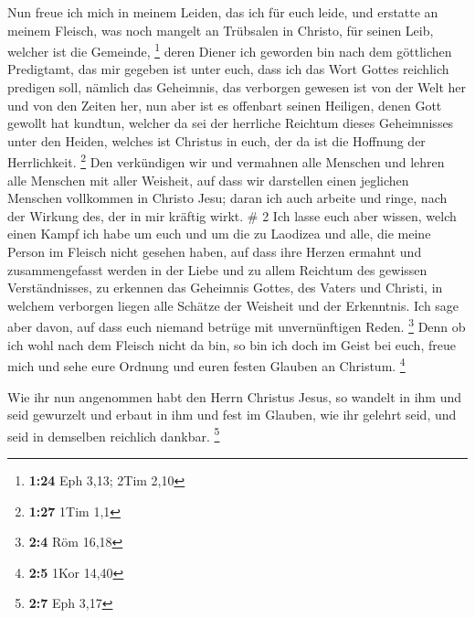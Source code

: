  Nun freue ich mich in meinem Leiden, das ich für euch
leide, und erstatte an meinem Fleisch, was noch mangelt an Trübsalen in
Christo, für seinen Leib, welcher ist die Gemeinde, \footnote{\textbf{1:24}
  Eph 3,13; 2Tim 2,10}  deren Diener ich geworden bin nach
dem göttlichen Predigtamt, das mir gegeben ist unter euch, dass ich das
Wort Gottes reichlich predigen soll,  nämlich das
Geheimnis, das verborgen gewesen ist von der Welt her und von den Zeiten
her, nun aber ist es offenbart seinen Heiligen,  denen Gott
gewollt hat kundtun, welcher da sei der herrliche Reichtum dieses
Geheimnisses unter den Heiden, welches ist Christus in euch, der da ist
die Hoffnung der Herrlichkeit. \footnote{\textbf{1:27} 1Tim 1,1}
 Den verkündigen wir und vermahnen alle Menschen und lehren
alle Menschen mit aller Weisheit, auf dass wir darstellen einen
jeglichen Menschen vollkommen in Christo Jesu;  daran ich
auch arbeite und ringe, nach der Wirkung des, der in mir kräftig wirkt.
\# 2  Ich lasse euch aber wissen, welch einen Kampf ich habe
um euch und um die zu Laodizea und alle, die meine Person im Fleisch
nicht gesehen haben,  auf dass ihre Herzen ermahnt und
zusammengefasst werden in der Liebe und zu allem Reichtum des gewissen
Verständnisses, zu erkennen das Geheimnis Gottes, des Vaters und
Christi,  in welchem verborgen liegen alle Schätze der
Weisheit und der Erkenntnis.  Ich sage aber davon, auf dass
euch niemand betrüge mit unvernünftigen Reden. \footnote{\textbf{2:4}
  Röm 16,18}  Denn ob ich wohl nach dem Fleisch nicht da
bin, so bin ich doch im Geist bei euch, freue mich und sehe eure Ordnung
und euren festen Glauben an Christum. \footnote{\textbf{2:5} 1Kor 14,40}

 Wie ihr nun angenommen habt den Herrn Christus Jesus, so
wandelt in ihm  und seid gewurzelt und erbaut in ihm und
fest im Glauben, wie ihr gelehrt seid, und seid in demselben reichlich
dankbar. \footnote{\textbf{2:7} Eph 3,17}

